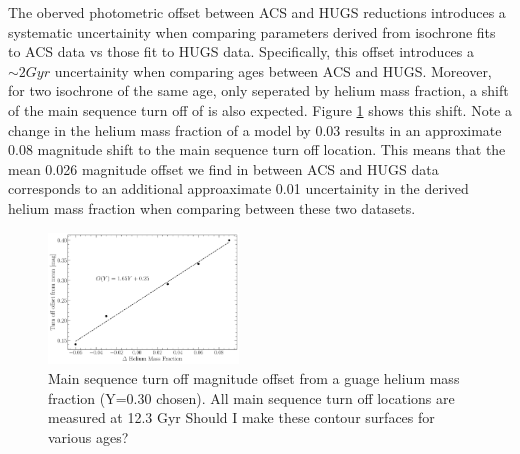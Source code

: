 The oberved photometric offset between ACS and HUGS reductions introduces a
systematic uncertainity when comparing parameters derived from isochrone fits
to ACS data vs those fit to HUGS data. Specifically, this offset introduces a
$\sim 2 Gyr$ uncertainity when comparing ages between ACS and HUGS. Moreover,
for two isochrone of the same age, only seperated by helium mass fraction, a
shift of the main sequence turn off of is also expected. Figure \ref{fig:HeMO}
shows this shift. Note a change in the helium mass fraction of a model by 0.03
results in an approximate 0.08 magnitude shift to the main sequence turn off
location. This means that the mean 0.026 magnitude offset we find in between
ACS and HUGS data corresponds to an additional approaximate 0.01 uncertainity
in the derived helium mass fraction when comparing between these two datasets. 

\begin{figure}
  \centering
  \includegraphics[width=0.45\textwidth]{src/figures/HeliumMeanOffset.pdf}
  \caption{Main sequence turn off magnitude offset from a guage helium mass fraction (Y=0.30 chosen). All main sequence turn off locations are measured at 12.3 Gyr {\color{blue} Should I make these contour surfaces for various ages?}}
  \label{fig:HeMO}
\end{figure}
